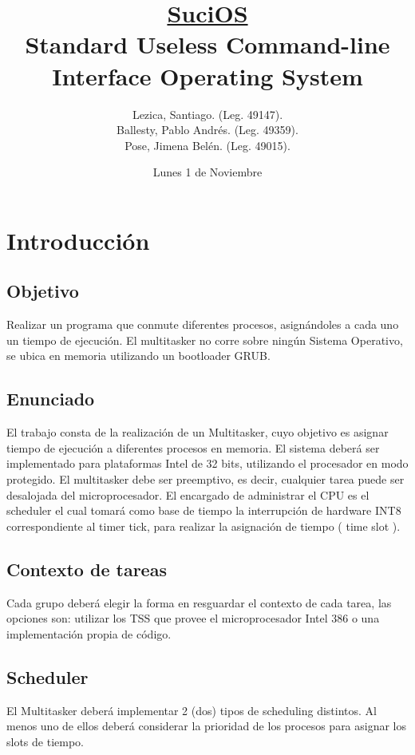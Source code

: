 \documentclass[a4paper,10pt]{article}
\title{\underline{\textbf{SuciOS}} \\ \small Standard Useless Command-line Interface Operating System}
\author{
Lezica, Santiago. (Leg. 49147).\\
Ballesty, Pablo Andrés. (Leg. 49359).\\
Pose, Jimena Belén. (Leg. 49015).\\
}
\date{Lunes 1 de Noviembre}
\begin{document}
\maketitle

\newpage
\tableofcontents

\newpage
\section{Introducción}
\subsection{Objetivo}
Realizar un programa que conmute diferentes procesos, asignándoles a cada 
uno un tiempo de ejecución. El multitasker no corre sobre ningún Sistema 
Operativo, se ubica en memoria utilizando un bootloader GRUB.


\subsection{Enunciado}
El trabajo consta de la realización de un Multitasker, cuyo objetivo es asignar
tiempo de ejecución a diferentes procesos en memoria. El sistema deberá ser
implementado para plataformas Intel de 32 bits, utilizando el procesador en
modo protegido. El multitasker debe ser preemptivo, es decir, cualquier tarea
puede ser desalojada del microprocesador. El encargado de administrar el CPU
es el scheduler el cual tomará como base de tiempo la interrupción de hardware
INT8 correspondiente al timer tick, para realizar la asignación de tiempo ( time
slot ).

\subsection{Contexto de tareas}
Cada grupo deberá elegir la forma en resguardar el contexto de cada tarea, las
opciones son: utilizar los TSS que provee el microprocesador Intel 386 o una
implementación propia de código.

\subsection{Scheduler}
El Multitasker deberá implementar 2 (dos) tipos de scheduling distintos. Al
menos uno de ellos deberá considerar la prioridad de los procesos para asignar
los slots de tiempo.
\end{document}
